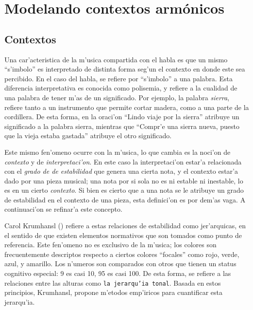 \section{Modelando contextos arm\'onicos}
\label{sec:harmonic_contexts}
\subsection{Contextos}
Una car'acteristica de la m'usica compartida con el habla es que un mismo ``s'imbolo'' es interpretado de distinta forma seg'un el contexto
en donde este sea percibido. En el caso del habla, se refiere por ``s'imbolo'' a una palabra. Esta diferencia interpretativa es conocida 
como polisemia, y refiere a la cualidad de una palabra de tener m'as de un significado. Por ejemplo, la palabra \emph{sierra}, refiere
tanto a un instrumento que permite cortar madera, como a una parte de la cordillera. De esta forma, en la oraci'on 
``Lindo viaje por la sierra'' atribuye un significado a la palabra sierra, mientras que ``Compr'e una sierra nueva, puesto que la vieja 
estaba gastada'' atribuye el otro significado. 

Este mismo fen'omeno ocurre con la m'usica, lo que cambia es la noci'on de \emph{contexto} y de \emph{interpretaci'on}. En este caso
la interpretaci'on estar'a relacionada con el \emph{grado de de estabilidad} que genera una cierta nota, y el contexto estar'a dado por
una pieza musical; una nota por si sola no es ni estable ni inestable, lo es en un cierto \emph{contexto}. Si bien es cierto que a una nota
se le atribuye un grado de estabilidad en el contexto de una pieza, esta definici'on es por dem'as vaga. A continuaci'on se refinar'a
este concepto.

Carol Krumhansl (\cita) refiere a estas relaciones de estabilidad como jer'arquicas, en el sentido de que existen elementos normativos que son tomados 
como punto de referencia. Este fen'omeno no es exclusivo de la m'usica; los colores son frecuentemente descriptos respecto a ciertos colores 
``focales'' como rojo, verde, azul, y amarillo. Los n'umeros son comparados con otros que tienen un status cognitivo especial: 9 es casi 10, 95 es casi 100. 
De esta forma, se refiere a las relaciones entre las alturas como \texttt{la jerarqu'ia tonal}. Basada en estos principios, Krumhansl, 
propone m'etodos emp'iricos para cuantificar esta jerarqu'ia.



